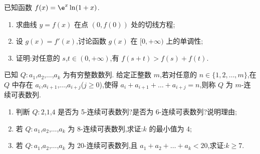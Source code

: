 \begin{problem}
已知函数 \(f(x)=\e^x\ln(1+x)\).

\begin{enumerate}
\item 求曲线 \(y=f(x)\) 在点 \((0,f(0))\) 处的切线方程;

\item 设 \(g(x)=f'(x)\),讨论函数 \(g(x)\) 在 \([0,+\infty)\) 上的单调性;

\item 证明:对任意的 \(s\),\(t\in(0,+\infty)\),有 \(f(s+t)>f(s)+f(t)\).
\end{enumerate}
\end{problem}


\begin{problem}
已知 \(Q:a_1\),\(a_2\),\(\dots\),\(a_k\) 为有穷整数数列. 给定正整数 \(m\),若对任意的 \(n\in\{1,2,\dots,m\}\),在 \(Q\) 中存在 \(a_i\),\(a_{i+1}\),\(\dots\),\(a_{i+j}\)(\(j\ge 0\)),使得 \(a_i+a_{i+1}+\dots+a_{i+j}=n\),则称 \(Q\) 为 \(m\)-连续可表数列.

\begin{enumerate}
\item 判断 \(Q:2\),\(1\),\(4\) 是否为 5-连续可表数列?是否为 6-连续可表数列?说明理由;

\item 若 \(Q:a_1\),\(a_2\),\(\dots\),\(a_k\) 为 8-连续可表数列,求证:\(k\) 的最小值为 4;

\item 若 \(Q:a_1\),\(a_2\),\(\dots\),\(a_k\) 为 20-连续可表数列,且 \(a_1+a_2+\dots+a_k<20\),求证:\(k\ge 7\).
\end{enumerate}
\end{problem}

